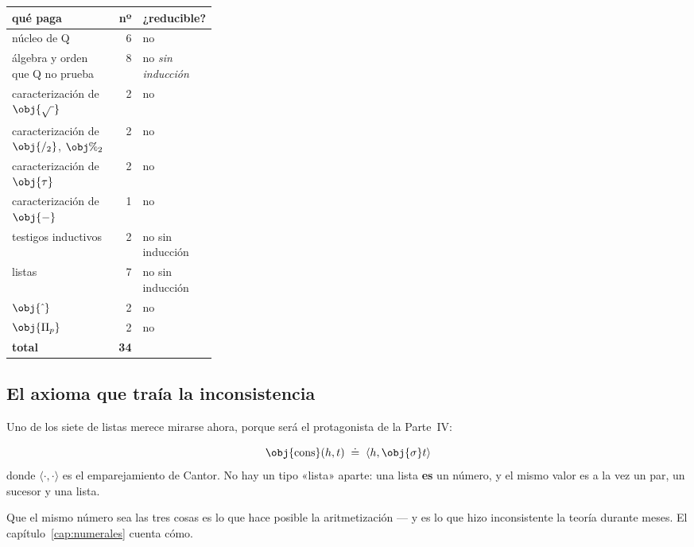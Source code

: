 \begin{center}\small
\begin{tabularx}{\linewidth}{@{}>{\raggedright\arraybackslash}X r >{\raggedright\arraybackslash}p{0.30\linewidth}@{}}
\toprule
qué paga & nº & ¿reducible? \\
\midrule
núcleo de Q & 6 & no \\
álgebra y orden que Q no prueba & 8 & no \emph{sin inducción} \\
caracterización de $\obj{\sqrt{\ }}$ & 2 & no \\
caracterización de $\obj{/_2}$, $\obj{\%_2}$ & 2 & no \\
caracterización de $\obj{\tau}$ & 2 & no \\
caracterización de $\obj{-}$ & 1 & no \\
testigos inductivos & 2 & no sin inducción \\
listas & 7 & no sin inducción \\
$\obj{\hat{\ }}$ & 2 & no \\
$\obj{\Pi_p}$ & 2 & no \\
\midrule
\textbf{total} & \textbf{34} & \\
\bottomrule
\end{tabularx}
\end{center}

\subsection*{El axioma que traía la inconsistencia}

Uno de los siete de listas merece mirarse ahora, porque será el protagonista de la Parte~IV:


\begin{matematica}
\[ \obj{\mathrm{cons}}(h,t) \;\doteq\; \langle h, \obj{\sigma}t\rangle \]
donde \(\langle\cdot,\cdot\rangle\) es el emparejamiento de Cantor. No hay un tipo «lista» aparte:
una lista \textbf{es} un número, y el mismo valor es a la vez un par, un sucesor y una lista.
\end{matematica}

\begin{leccion}
Que el mismo número sea las tres cosas es lo que hace posible la aritmetización — y es lo que hizo
inconsistente la teoría durante meses. El capítulo~\ref{cap:numerales} cuenta cómo.
\end{leccion}

